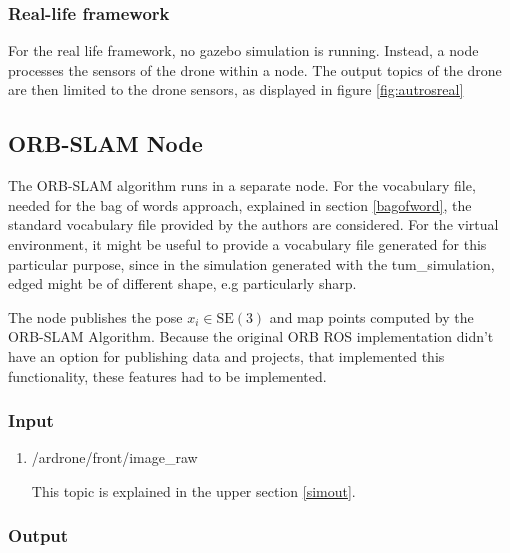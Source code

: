 	\subsubsection{Real-life framework}

	For the real life framework, no gazebo simulation is running. Instead, a node processes the sensors of the drone within a node. The output 
	topics of the drone are then limited to the drone sensors, as displayed in figure \ref{fig:autrosreal}
	
	
	\subsection{ORB-SLAM Node}\label{orbnode}
	
	The ORB-SLAM algorithm runs in a separate node. For the vocabulary file, needed for the bag of words approach, explained in section \ref{bagofword}, the 
	standard vocabulary file provided by the authors are considered. For the virtual environment, it might be useful to provide a vocabulary file 
	generated for this particular purpose, since in the simulation generated with the tum\_simulation, edged might be of different shape, e.g particularly sharp. 
	
	The node publishes the pose $x_i \in \text{SE}(3)$ and map points computed by the ORB-SLAM Algorithm. Because the original ORB ROS implementation didn't have an option for publishing data and 
	projects, that implemented this functionality, these features had to be implemented. 
	
	\subsubsection{Input}
	
	\begin{enumerate}
	\item{/ardrone/front/image\_raw}
	
	This topic is explained in the upper section \ref{simout}.
	
	\end{enumerate}
	
    \subsubsection{Output}
	

